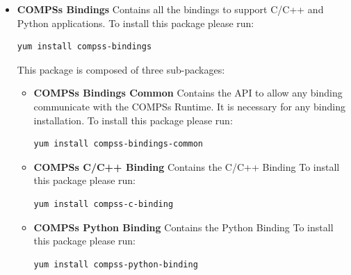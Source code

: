 \begin{itemize}
 \item \textbf{COMPSs Bindings} \newline
       Contains all the bindings to support C/C++ and Python applications. 
       \newline
       To install this package please run:
       \begin{lstlisting}[language=bash]
	  yum install compss-bindings
       \end{lstlisting}
       This package is composed of three sub-packages:
       \begin{itemize}
        \item \textbf{COMPSs Bindings Common} \newline
	      Contains the API to allow any binding communicate with the COMPSs Runtime. It is necessary for any binding installation.
	      \newline
	      To install this package please run:
	      \begin{lstlisting}[language=bash]
		  yum install compss-bindings-common
	      \end{lstlisting}
        \item \textbf{COMPSs C/C++ Binding} \newline
	      Contains the C/C++ Binding
	      \newline
	      To install this package please run:
	      \begin{lstlisting}[language=bash]
		  yum install compss-c-binding
	      \end{lstlisting}
        \item \textbf{COMPSs Python Binding} \newline
	      Contains the Python Binding
	      \newline
	      To install this package please run:
	      \begin{lstlisting}[language=bash]
		  yum install compss-python-binding
	      \end{lstlisting}
       \end{itemize}


\end{itemize}
